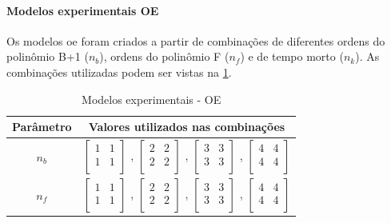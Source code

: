 \paragraph*{\textbf{Modelos experimentais OE}}
\label{par:modelos_experimentais_oe}

Os modelos \acrshort{oe} foram criados a partir de combinações de diferentes ordens do polinômio B+1 ($n_b$),
ordens do polinômio F ($n_f$) e de tempo morto ($n_k$). As combinações utilizadas podem ser vistas na
\cref{tab:tclabsp-models-oe}.

\begin{table}[h]
	\centering
	\caption{Modelos experimentais - OE}
	\label{tab:tclabsp-models-oe}
	\begin{tabular}{c|c} \toprule
		{Parâmetro}		&	{Valores utilizados nas combinações}									\\ \midrule
		$n_b$			&
							$ \begin{bmatrix}	1	&	1	\\	1	&	1	\\	\end{bmatrix} $	,		
							$ \begin{bmatrix}	2	&	2	\\	2	&	2	\\	\end{bmatrix} $	,		
							$ \begin{bmatrix}	3	&	3	\\	3	&	3	\\	\end{bmatrix} $	,		
							$ \begin{bmatrix}	4	&	4	\\	4	&	4	\\	\end{bmatrix} $		\\ \midrule
		$n_f$			&
							$ \begin{bmatrix}	1	&	1	\\	1	&	1	\\	\end{bmatrix} $	,		
							$ \begin{bmatrix}	2	&	2	\\	2	&	2	\\	\end{bmatrix} $	,		
							$ \begin{bmatrix}	3	&	3	\\	3	&	3	\\	\end{bmatrix} $	,		
							$ \begin{bmatrix}	4	&	4	\\	4	&	4	\\	\end{bmatrix} $		\\ \midrule

\end{tabular}
\end{table}
